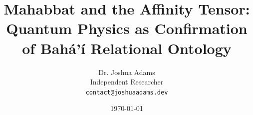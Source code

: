 \documentclass[12pt, a4paper]{article}
\begin{document}

\title{Mahabbat and the Affinity Tensor: Quantum Physics as Confirmation\\
       of Bahá'í Relational Ontology}

\author{Dr. Joshua Adams \\
        \small Independent Researcher\\
        \small \texttt{contact@joshuaadams.dev}}

\date{\today}

\maketitle

\begin{abstract}

\end{abstract}

\newpage
\tableofcontents
\newpage







\newpage


\end{document}
